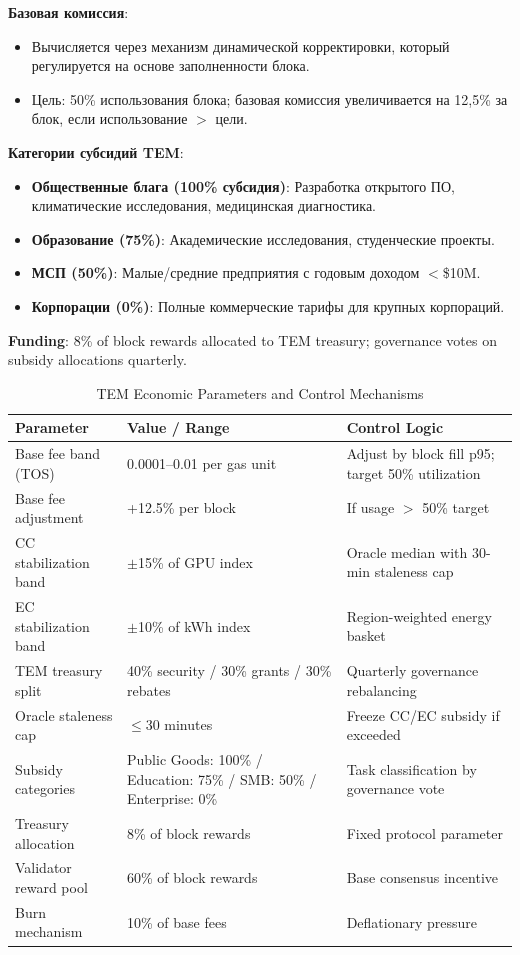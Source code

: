 \documentclass[11pt]{article}
\begin{document}
\textbf{Базовая комиссия}:
\begin{itemize}[noitemsep]
  \item Вычисляется через механизм динамической корректировки, который регулируется на основе заполненности блока.
  \item Цель: 50\% использования блока; базовая комиссия увеличивается на 12,5\% за блок, если использование $>$ цели.
\end{itemize}

\textbf{Категории субсидий TEM}:
\begin{itemize}[noitemsep]
  \item \textbf{Общественные блага (100\% субсидия)}: Разработка открытого ПО, климатические исследования, медицинская диагностика.
  \item \textbf{Образование (75\%)}: Академические исследования, студенческие проекты.
  \item \textbf{МСП (50\%)}: Малые/средние предприятия с годовым доходом $<$\$10M.
  \item \textbf{Корпорации (0\%)}: Полные коммерческие тарифы для крупных корпораций.
\end{itemize}

\textbf{Funding}: 8\% of block rewards allocated to TEM treasury; governance votes on subsidy allocations quarterly.

\begin{table}[H]
\centering
\caption{TEM Economic Parameters and Control Mechanisms}
\label{tab:tem-parameters}
\begin{tabular}{@{}p{}p{}p{}@{}}
\toprule
\textbf{Parameter} & \textbf{Value / Range} & \textbf{Control Logic} \\ \midrule
Base fee band (TOS) & 0.0001--0.01 per gas unit & Adjust by block fill p95; target 50\% utilization \\
Base fee adjustment & +12.5\% per block & If usage $>$ 50\% target \\
CC stabilization band & $\pm$15\% of GPU index & Oracle median with 30-min staleness cap \\
EC stabilization band & $\pm$10\% of kWh index & Region-weighted energy basket \\
TEM treasury split & 40\% security / 30\% grants / 30\% rebates & Quarterly governance rebalancing \\
Oracle staleness cap & $\le$30 minutes & Freeze CC/EC subsidy if exceeded \\
Subsidy categories & Public Goods: 100\% / Education: 75\% / SMB: 50\% / Enterprise: 0\% & Task classification by governance vote \\
Treasury allocation & 8\% of block rewards & Fixed protocol parameter \\
Validator reward pool & 60\% of block rewards & Base consensus incentive \\
Burn mechanism & 10\% of base fees & Deflationary pressure \\
\bottomrule
\end{tabular}
\end{table}
\end{document}
